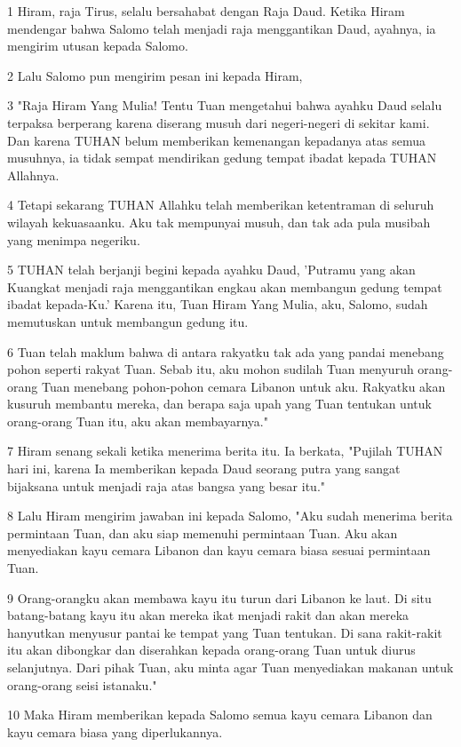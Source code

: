 \par 1 Hiram, raja Tirus, selalu bersahabat dengan Raja Daud. Ketika Hiram mendengar bahwa Salomo telah menjadi raja menggantikan Daud, ayahnya, ia mengirim utusan kepada Salomo.
\par 2 Lalu Salomo pun mengirim pesan ini kepada Hiram,
\par 3 "Raja Hiram Yang Mulia! Tentu Tuan mengetahui bahwa ayahku Daud selalu terpaksa berperang karena diserang musuh dari negeri-negeri di sekitar kami. Dan karena TUHAN belum memberikan kemenangan kepadanya atas semua musuhnya, ia tidak sempat mendirikan gedung tempat ibadat kepada TUHAN Allahnya.
\par 4 Tetapi sekarang TUHAN Allahku telah memberikan ketentraman di seluruh wilayah kekuasaanku. Aku tak mempunyai musuh, dan tak ada pula musibah yang menimpa negeriku.
\par 5 TUHAN telah berjanji begini kepada ayahku Daud, 'Putramu yang akan Kuangkat menjadi raja menggantikan engkau akan membangun gedung tempat ibadat kepada-Ku.' Karena itu, Tuan Hiram Yang Mulia, aku, Salomo, sudah memutuskan untuk membangun gedung itu.
\par 6 Tuan telah maklum bahwa di antara rakyatku tak ada yang pandai menebang pohon seperti rakyat Tuan. Sebab itu, aku mohon sudilah Tuan menyuruh orang-orang Tuan menebang pohon-pohon cemara Libanon untuk aku. Rakyatku akan kusuruh membantu mereka, dan berapa saja upah yang Tuan tentukan untuk orang-orang Tuan itu, aku akan membayarnya."
\par 7 Hiram senang sekali ketika menerima berita itu. Ia berkata, "Pujilah TUHAN hari ini, karena Ia memberikan kepada Daud seorang putra yang sangat bijaksana untuk menjadi raja atas bangsa yang besar itu."
\par 8 Lalu Hiram mengirim jawaban ini kepada Salomo, "Aku sudah menerima berita permintaan Tuan, dan aku siap memenuhi permintaan Tuan. Aku akan menyediakan kayu cemara Libanon dan kayu cemara biasa sesuai permintaan Tuan.
\par 9 Orang-orangku akan membawa kayu itu turun dari Libanon ke laut. Di situ batang-batang kayu itu akan mereka ikat menjadi rakit dan akan mereka hanyutkan menyusur pantai ke tempat yang Tuan tentukan. Di sana rakit-rakit itu akan dibongkar dan diserahkan kepada orang-orang Tuan untuk diurus selanjutnya. Dari pihak Tuan, aku minta agar Tuan menyediakan makanan untuk orang-orang seisi istanaku."
\par 10 Maka Hiram memberikan kepada Salomo semua kayu cemara Libanon dan kayu cemara biasa yang diperlukannya.
